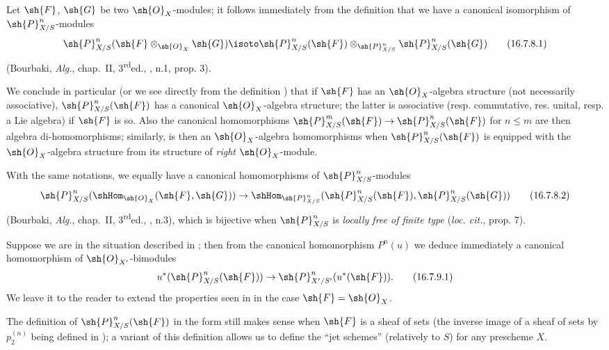 \begin{env}[16.7.8]
\label{IV.16.7.8}
Let $\sh{F}$, $\sh{G}$ be two $\sh{O}_X$-modules;
it follows immediately from the definition  that we have a canonical isomorphism of $\sh{P}_{X/S}^n$-modules
\[
  \label{IV.16.7.8.1}
  \sh{P}_{X/S}^n(\sh{F} \otimes_{\sh{O}_X} \sh{G}) \isoto \sh{P}_{X/S}^n(\sh{F}) \otimes_{\sh{P}_{X/S}^n} \sh{P}_{X/S}^n(\sh{G})
  \tag{16.7.8.1}
\]
(Bourbaki, \emph{Alg.}, chap.~II, 3\textsuperscript{rd}ed., , n.1, prop. 3).

We conclude in particular (or we see directly from the definition ) that if $\sh{F}$ has an $\sh{O}_X$-algebra structure (not necessarily associative), $\sh{P}_{X/S}^n(\sh{F})$ has a canonical $\sh{O}_X$-algebra structure;
the latter is associative (resp. commutative, res. unital, resp. a Lie algebra) if $\sh{F}$ is so.
Also the canonical homomorphisms $\sh{P}_{X/S}^m(\sh{F}) \to \sh{P}_{X/S}^n(\sh{F})$ for $n \leq m$  are then algebra di-homomorphisms;
similarly,  is then an $\sh{O}_X$-algebra homomorphisms when $\sh{P}_{X/S}^n(\sh{F})$ is equipped with the $\sh{O}_X$-algebra structure from its structure of \emph{right} $\sh{O}_X$-module.

With the same notations, we equally have a canonical homomorphisms of $\sh{P}_{X/S}^n$-modules
\[
  \label{IV.16.7.8.2}
  \sh{P}_{X/S}^n(\shHom_{\sh{O}_X}(\sh{F}, \sh{G})) \to \shHom_{\sh{P}_{X/S}^n}(\sh{P}_{X/S}^n(\sh{F}), \sh{P}_{X/S}^n(\sh{G}))
  \tag{16.7.8.2}
\]
(Bourbaki, \emph{Alg.}, chap.~II, 3\textsuperscript{rd}ed., , n.3), which is bijective when $\sh{P}_{X/S}^n$ is \emph{locally free of finite type} (\emph{loc. cit.}, prop. 7).
\end{env}

\begin{env}[16.7.9]
\label{IV.16.7.9}
Suppose we are in the situation described in ;
then from the canonical homomorphism $P^n(u)$  we deduce immediately a canonical homomorphism of $\sh{O}_{X'}$-bimodules 
\[
  \label{IV.16.7.9.1}
  u^*(\sh{P}_{X/S}^n(\sh{F})) \to \sh{P}_{X'/S'}^n(u^*(\sh{F})).
  \tag{16.7.9.1}
\]
We leave it to the reader to extend the properties seen in  in the case $\sh{F} = \sh{O}_X$.
\end{env}

\begin{remark}[16.7.10]
\label{IV.16.7.10}
The definition of $\sh{P}_{X/S}^n(\sh{F})$ in the form  still makes sense when $\sh{F}$ is a sheaf of sets (the inverse image of a sheaf of sets by $p_2^{(n)}$ being defined in );
a variant of this definition allows us to define the ``jet schemes'' (relatively to $S$) for any prescheme $X$.
\end{remark}


